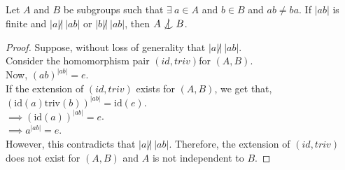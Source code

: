 \documentclass[10pt,a4paper]{amsart}
\def\indep{\mathrel{\raise0.2ex\hbox{\ooalign{\hidewidth$\vert$\hidewidth\cr\raise-0.9ex\hbox{$\smile$}}}}}
\begin{document}
			\begin{proposition}\label{OrderTheorem}
				Let $A$ and $B$ be subgroups such that $\exists \ a \in A$ and $b \in B$ and $ab \not=ba$. If $|ab|$ is finite and   $|a| \not | \ |ab|$ or $|b| \not | \ |ab|$, then $A \not \indep B$.
			\end{proposition}

			\begin{proof}
				Suppose, without loss of generality that $|a| \not | \ |ab|$.\\
				
				
				
				Consider the homomorphism pair $(id, triv)$for $(A, B)$.\\
				
				Now, $(ab)^{|ab|} = e$.\\
				
				
				If the extension of $(id, triv)$ exists for $(A, B)$, we get that,\\
				
				$(\text{id}(a)\text{triv}(b))^{|ab|} = \text{id}(e).$\\
				
				$\implies (\text{id}(a))^{|ab|}  = e$.\\
				
				$\implies a^{|ab|} = e$.\\
				
				However, this contradicts that $|a| \not | \ |ab|$. Therefore, the extension of $(id, triv)$ does not exist for $(A, B)$ and  $A$ is not independent to $B$.    
			\end{proof}
\end{document}
